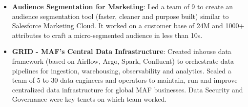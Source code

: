 \documentclass[letterpaper,11pt]{article}
\newcommand{\resumeItem}[2]{
  \item\small{
    \textbf{#1}{: #2 \vspace{-2pt}}
  }
}
\newcommand{\resumeItemListStart}{\begin{itemize}}
\newcommand{\resumeItemListEnd}{\end{itemize}\vspace{-5pt}}
\begin{document}
      \resumeItemListStart
        \resumeItem{Audience Segmentation for Marketing}
          {Led a team of 9 to create an audience segmentation tool (faster, cleaner and purpose built) similar to Salesforce Marketing Cloud. It worked on a customer base of 24M and 1000+ attributes to craft a micro-segmented audience in less than 10s.}
        \resumeItem{GRID - MAF's Central Data Infrastructure}
          {Created inhouse data framework (based on Airflow, Argo, Spark, Confluent) to orchestrate data pipelines for ingestion, warehousing, observability and analytics. Scaled a team of 5 to 30 data engineers and operators to maintain, run and improve centralized data infrastructure for global MAF businesses. Data Security and Governance were key tenets on which team worked.}
      \resumeItemListEnd
\end{document}
